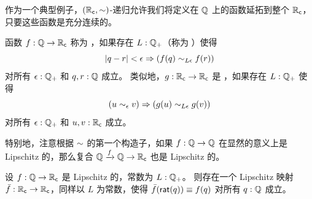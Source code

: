 作为一个典型例子，$(\mathbb{R}_\mathsf{c},\mathord\sim)$-递归允许我们将定义在 $\mathbb{Q}$ 上的函数延拓到整个 $\mathbb{R}_\mathsf{c}$，只要这些函数是充分连续的。
%

\begin{defn}\label{defn:lipschitz}
  函数 $f:\mathbb{Q}\to\mathbb{R}_\mathsf{c}$ 称为 
  ，如果存在 $L:\mathbb{Q}_{+}$（称为 ）使得
  \[ |q - r|<\epsilon \Rightarrow (f(q) \sim_{L\epsilon} f(r)) \]
  对所有 $\epsilon:\mathbb{Q}_{+}$ 和 $q,r:\mathbb{Q}$ 成立。
  类似地，$g:\mathbb{R}_\mathsf{c}\to\mathbb{R}_\mathsf{c}$ 是 ，如果存在 $L:\mathbb{Q}_{+}$ 使得
  \[ (u\sim_{\epsilon} v) \Rightarrow (g(u) \sim_{L\epsilon} g(v)) \]
  对所有 $\epsilon:\mathbb{Q}_{+}$ 和 $u,v:\mathbb{R}_\mathsf{c}$ 成立。
\end{defn}

特别地，注意根据 $\mathord\sim$ 的第一个构造子，如果 $f:\mathbb{Q}\to\mathbb{Q}$ 在显然的意义上是 Lipschitz 的，那么复合 $\mathbb{Q}\xrightarrow{f} \mathbb{Q} \to \mathbb{R}_\mathsf{c}$ 也是 Lipschitz 的。

\begin{lem}\label{RC-extend-Q-Lipschitz}
  设 $f : \mathbb{Q} \to \mathbb{R}_\mathsf{c}$ 是 Lipschitz 的，常数为 $L : \mathbb{Q}_{+}$。
  则存在一个 Lipschitz 映射 $\bar{f} : \mathbb{R}_\mathsf{c} \to \mathbb{R}_\mathsf{c}$，同样以 $L$ 为常数，使得 $\bar{f}(\mathsf{rat}(q)) \equiv f(q)$ 对所有 $q:\mathbb{Q}$ 成立。
\end{lem}

